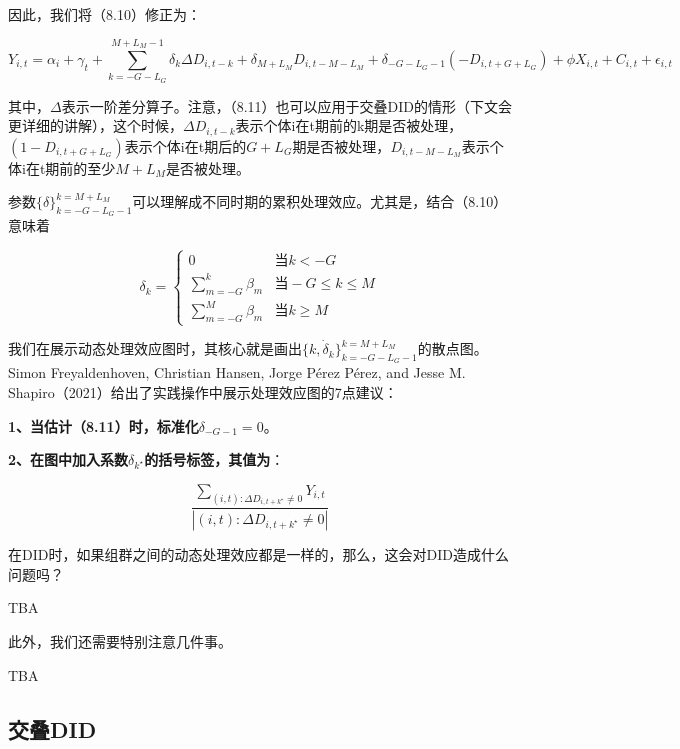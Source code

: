 \documentclass[cn,12pt,math=newtx,citestyle=gb7714-2015,bibstyle=gb7714-2015]{elegantbook}
\begin{document}
	因此，我们将（8.10）修正为：
	
		\begin{equation}
		Y_{i,t} = \alpha_i + \gamma_t + \sum_{k= -G-L_G}^{M+L_M-1} \delta_k \Delta D_{i,t-k} + \delta_{M+L_M}D_{i,t-M-L_M} + \delta_{-G-L_G-1}(-D_{i,t+G+L_G}) + \phi X_{i,t} + C_{i,t} + \epsilon_{i,t}
	\end{equation}
	
	其中，$\Delta$表示一阶差分算子。注意，（8.11）也可以应用于交叠DID的情形（下文会更详细的讲解），这个时候，$\Delta D_{i,t-k}$表示个体i在t期前的k期是否被处理，$(1-D_{i,t+G+L_G})$表示个体i在t期后的$G+L_G$期是否被处理，$D_{i,t-M-L_M}$表示个体i在t期前的至少$M+L_M$是否被处理。
	
	参数$\{\delta\}_{k=-G-L_G-1}^{k=M+L_M}$可以理解成不同时期的累积处理效应。尤其是，结合（8.10）意味着
	
\begin{equation}
\delta_k =	\begin{cases}
		 0  & \text{当} k< -G \\
		\sum_{m=-G}^{k}\beta_m    &\text{当}-G \le k \le M \\
		\sum_{m=-G}^{M}\beta_m  & \text{当} k \ge M 
	\end{cases}
\end{equation}
		
我们在展示动态处理效应图时，其核心就是画出$\{k,\dot{\delta}_k\}_{k=-G-L_G-1}^{k=M+L_M}$的散点图。Simon Freyaldenhoven, Christian Hansen, Jorge Pérez Pérez, and Jesse M. Shapiro（2021）给出了实践操作中展示处理效应图的7点建议：

\textbf{1、当估计（8.11）时，标准化$\delta_{-G-1}=0$}。

\textbf{2、在图中加入系数$\delta_{k^\star}$的括号标签，其值为}：

\begin{equation}
	\frac{\sum_{(i,t):\Delta D_{i,t+k^\star} \neq 0}Y_{i,t}}{|(i,t):\Delta D_{i,t+k^\star} \neq 0|}
\end{equation}
	
	
	
	
	
	在DID时，如果组群之间的动态处理效应都是一样的，那么，这会对DID造成什么问题吗？
	
	TBA
	
	此外，我们还需要特别注意几件事。
	
	TBA
	
	
	\subsection{交叠DID}
	
\end{document}
